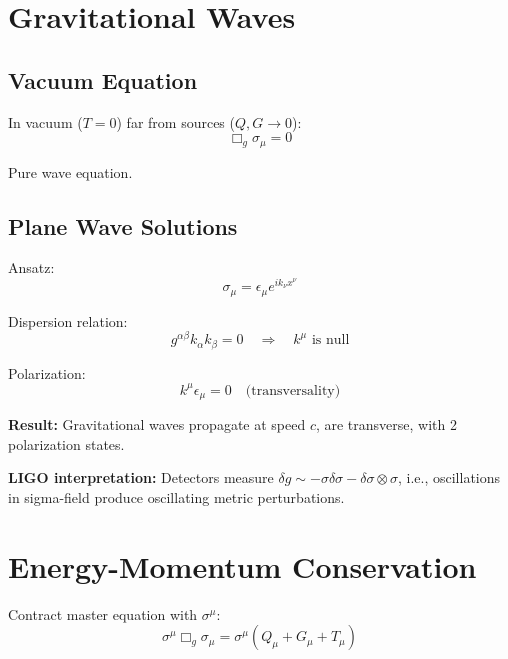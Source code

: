 \documentclass[11pt,a4paper]{article}
\theoremstyle{definition}
\theoremstyle{remark}
\begin{document}
		\section{Gravitational Waves}
		
		\subsection{Vacuum Equation}
		
		In vacuum ($T = 0$) far from sources ($Q,G \to 0$):
		\begin{equation}
			\Box_g\sigma_\mu = 0
		\end{equation}
		
		Pure wave equation.
		
		\subsection{Plane Wave Solutions}
		
		Ansatz:
		\begin{equation}
			\sigma_\mu = \epsilon_\mu e^{ik_\nu x^\nu}
		\end{equation}
		
		Dispersion relation:
		\begin{equation}
			g^{\alpha\beta}k_\alpha k_\beta = 0 \quad \Rightarrow \quad k^\mu \text{ is null}
		\end{equation}
		
		Polarization:
		\begin{equation}
			k^\mu\epsilon_\mu = 0 \quad \text{(transversality)}
		\end{equation}
		
		\textbf{Result:} Gravitational waves propagate at speed $c$, are transverse, with 2 polarization states.
		
		\textbf{LIGO interpretation:} Detectors measure $\delta g \sim -\sigma\delta\sigma - \delta\sigma \otimes\sigma$, i.e., oscillations in sigma-field produce oscillating metric perturbations.
		
		\section{Energy-Momentum Conservation}
		
		Contract master equation with $\sigma^\mu$:
		\begin{equation}
			\sigma^\mu\Box_g\sigma_\mu = \sigma^\mu(Q_\mu + G_\mu + T_\mu)
		\end{equation}
		
\end{document}
